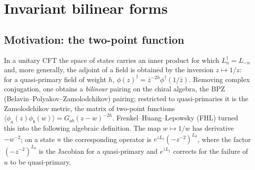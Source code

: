 \section{Invariant bilinear forms}\label{l04:sec:forms}

\subsection{Motivation: the two-point function}

In a unitary CFT the space of states carries an inner product for which $L_n^\dagger = L_{-n}$ and,
more generally, the adjoint of a field is obtained by the inversion $z\mapsto1/z$: for a quasi-primary
field of weight $h$, $\phi(z)^\dagger = \bar z^{-2h}\phi^\dagger(1/\bar z)$. Removing complex conjugation,
one obtains a \emph{bilinear} pairing on the chiral algebra, the BPZ (Belavin--Polyakov--Zamolodchikov)
pairing; restricted to quasi-primaries it is the Zamolodchikov metric, the matrix of two-point
functions $\langle\phi_a(z)\phi_b(w)\rangle = G_{ab}(z-w)^{-2h}$. Frenkel--Huang--Lepowsky (FHL) turned this
into the following algebraic definition. The map $w\mapsto1/w$ has derivative $-w^{-2}$; on a state $u$
the corresponding operator is $e^{zL_1}(-z^{-2})^{L_0}$, where the factor $(-z^{-2})^{L_0}$ is the
Jacobian for a quasi-primary and $e^{zL_1}$ corrects for the failure of $u$ to be quasi-primary.

